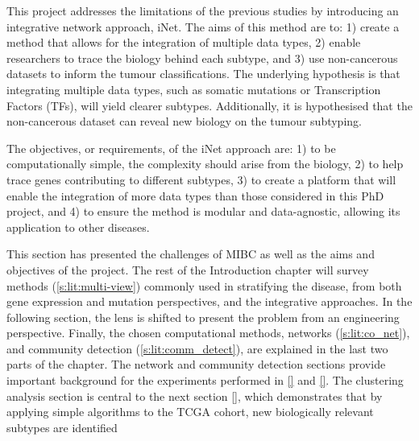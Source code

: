 This project addresses the limitations of the previous studies by introducing an integrative network approach, iNet. The aims of this method are to: 1) create a method that allows for the integration of multiple data types, 2) enable researchers to trace the biology behind each subtype, and 3) use non-cancerous datasets to inform the tumour classifications. The underlying hypothesis is that integrating multiple data types, such as somatic mutations or Transcription Factors (TFs), will yield clearer subtypes. Additionally, it is hypothesised that the non-cancerous dataset can reveal new biology on the tumour subtyping.

The objectives, or requirements, of the iNet approach are: 1) to be computationally simple, the complexity should arise from the biology, 2) to help trace genes contributing to different subtypes, 3) to create a platform that will enable the integration of more data types than those considered in this PhD project, and 4) to ensure the method is modular and data-agnostic, allowing its application to other diseases.

This section has presented the challenges of MIBC as well as the aims and objectives of the project. The rest of the Introduction chapter will survey methods (\ref{s:lit:multi-view}) commonly used in stratifying the disease, from both gene expression and mutation perspectives, and the integrative approaches. In the following section, the lens is shifted to present the problem from an engineering perspective. Finally, the chosen computational methods, networks (\ref{s:lit:co_net}), and community detection (\ref{s:lit:comm_detect}), are explained in the last two parts of the chapter. The network and community detection sections provide important background for the experiments performed in \ref{} and \ref{}. The clustering analysis section is central to the next section \ref{}, which demonstrates that by applying simple algorithms to the TCGA cohort, new biologically relevant subtypes are identified

